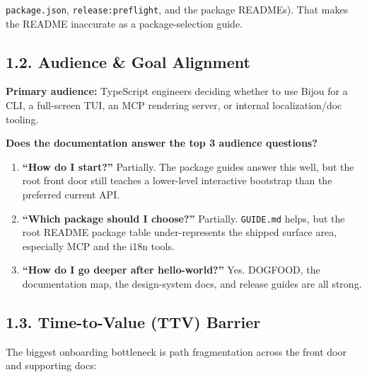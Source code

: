 \texttt{p\allowbreak{}a\allowbreak{}c\allowbreak{}k\allowbreak{}a\allowbreak{}g\allowbreak{}e\allowbreak{}.\allowbreak{}j\allowbreak{}s\allowbreak{}o\allowbreak{}n}, \texttt{r\allowbreak{}e\allowbreak{}l\allowbreak{}e\allowbreak{}a\allowbreak{}s\allowbreak{}e\allowbreak{}:\allowbreak{}p\allowbreak{}r\allowbreak{}e\allowbreak{}f\allowbreak{}l\allowbreak{}i\allowbreak{}g\allowbreak{}h\allowbreak{}t}, and the package READMEs). That makes the README inaccurate as a package-selection guide.

\subsection{1.2. Audience \& Goal Alignment}\label{record-417-audience-goal-alignment}

\textbf{Primary audience:} TypeScript engineers deciding whether to use Bijou for a CLI, a full-screen TUI, an MCP rendering server, or internal localization/doc tooling.

\textbf{Does the documentation answer the top 3 audience questions?}

\begin{enumerate}
\def\labelenumi{\arabic{enumi}.}
\tightlist
\item
  \textbf{``How do I start?''} Partially. The package guides answer this well, but the root front door still teaches a lower-level interactive bootstrap than the preferred current API.
\item
  \textbf{``Which package should I choose?''} Partially. \texttt{G\allowbreak{}U\allowbreak{}I\allowbreak{}D\allowbreak{}E\allowbreak{}.\allowbreak{}m\allowbreak{}d} helps, but the root README package table under-represents the shipped surface area, especially MCP and the i18n tools.
\item
  \textbf{``How do I go deeper after hello-world?''} Yes. DOGFOOD, the documentation map, the design-system docs, and release guides are all strong.
\end{enumerate}

\subsection{1.3. Time-to-Value (TTV) Barrier}\label{record-417-time-to-value-ttv-barrier}

The biggest onboarding bottleneck is path fragmentation across the front door and supporting docs:

